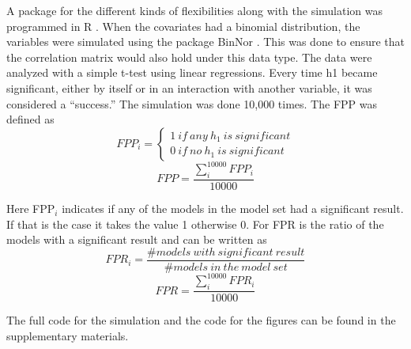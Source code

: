 A package for the different kinds of flexibilities along with the simulation was programmed in R \citep{Team2018}. When the covariates had a binomial distribution, the variables were simulated using the package BinNor \citep{Demirtas2014}. This was done to ensure that the correlation matrix would also hold under this data type. The data were analyzed with a simple t-test using linear regressions. Every time h1 became significant, either by itself or in an interaction with another variable, it was considered a “success.” The simulation was done 10,000 times. The FPP was defined as \\

\[FPP_i=\left. \left\{\begin{array}{c}
1\ if\ any\ h_1\ is\ significant \\ 
0\ if\ no\ h_1\ is\ significant\  \end{array}
\right.\] 
\[FPP=\frac{\sum^{10000}_i{FPP_i}}{10000}\] 


Here FPP${}_{i}$ indicates if any of the models in the model set had a significant result. If that is the case it takes the value 1 otherwise 0. For FPR is the ratio of the models with a significant result and can be written as \\

\[FPR_i=\frac{\#models\ with\ significant\ result}{\#models\ in\ the\ model\ set}\] 
\[FPR=\frac{\sum^{10000}_i{FPR_i}}{10000}\] 


The full code for the simulation and the code for the figures can be found in the supplementary materials. 

